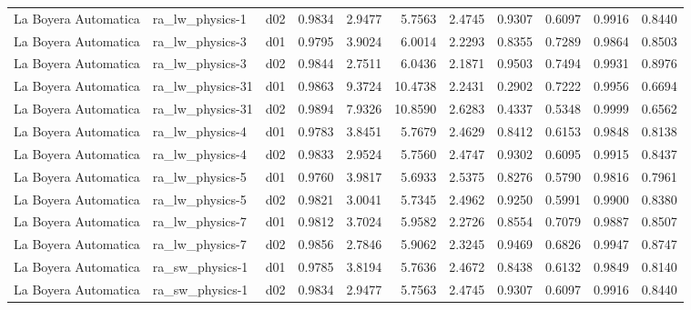 \begin{longtable}{lllrrrrrrrr}
 La Boyera Automatica  &       ra\_lw\_physics-1 &     d02 &   0.9834 &   2.9477 &   5.7563 &       2.4745 &        0.9307 &       0.6097 &           0.9916 &  0.8440 \\
 La Boyera Automatica  &       ra\_lw\_physics-3 &     d01 &   0.9795 &   3.9024 &   6.0014 &       2.2293 &        0.8355 &       0.7289 &           0.9864 &  0.8503 \\
 La Boyera Automatica  &       ra\_lw\_physics-3 &     d02 &   0.9844 &   2.7511 &   6.0436 &       2.1871 &        0.9503 &       0.7494 &           0.9931 &  0.8976 \\
 La Boyera Automatica  &      ra\_lw\_physics-31 &     d01 &   0.9863 &   9.3724 &  10.4738 &       2.2431 &        0.2902 &       0.7222 &           0.9956 &  0.6694 \\
 La Boyera Automatica  &      ra\_lw\_physics-31 &     d02 &   0.9894 &   7.9326 &  10.8590 &       2.6283 &        0.4337 &       0.5348 &           0.9999 &  0.6562 \\
 La Boyera Automatica  &       ra\_lw\_physics-4 &     d01 &   0.9783 &   3.8451 &   5.7679 &       2.4629 &        0.8412 &       0.6153 &           0.9848 &  0.8138 \\
 La Boyera Automatica  &       ra\_lw\_physics-4 &     d02 &   0.9833 &   2.9524 &   5.7560 &       2.4747 &        0.9302 &       0.6095 &           0.9915 &  0.8437 \\
 La Boyera Automatica  &       ra\_lw\_physics-5 &     d01 &   0.9760 &   3.9817 &   5.6933 &       2.5375 &        0.8276 &       0.5790 &           0.9816 &  0.7961 \\
 La Boyera Automatica  &       ra\_lw\_physics-5 &     d02 &   0.9821 &   3.0041 &   5.7345 &       2.4962 &        0.9250 &       0.5991 &           0.9900 &  0.8380 \\
 La Boyera Automatica  &       ra\_lw\_physics-7 &     d01 &   0.9812 &   3.7024 &   5.9582 &       2.2726 &        0.8554 &       0.7079 &           0.9887 &  0.8507 \\
 La Boyera Automatica  &       ra\_lw\_physics-7 &     d02 &   0.9856 &   2.7846 &   5.9062 &       2.3245 &        0.9469 &       0.6826 &           0.9947 &  0.8747 \\
 La Boyera Automatica  &       ra\_sw\_physics-1 &     d01 &   0.9785 &   3.8194 &   5.7636 &       2.4672 &        0.8438 &       0.6132 &           0.9849 &  0.8140 \\
 La Boyera Automatica  &       ra\_sw\_physics-1 &     d02 &   0.9834 &   2.9477 &   5.7563 &       2.4745 &        0.9307 &       0.6097 &           0.9916 &  0.8440 \\

\end{longtable}

